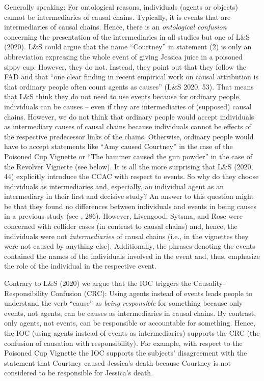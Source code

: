 \documentclass[egregdoesnotlikesansseriftitles,12pt]{scrartcl}
\begin{document}
Generally speaking: For ontological reasons, individuals (agents or objects) cannot be intermediaries of causal chains. Typically, it is events that are intermediaries of causal chains. Hence, there is an \textit{ontological confusion} concerning the presentation of the intermediaries in all studies but one of L\&S (2020). L\&S could argue that the name ``Courtney'' in statement (2) is only an abbreviation expressing the whole event of giving Jessica juice in a poisoned sippy cup. However, they do not. Instead, they point out that they follow the FAD and that ``one clear finding in recent empirical work on causal attribution is that ordinary people often count agents as causes'' (L\&S 2020, 53). That means that L\&S think they do not need to use events because for ordinary people, individuals can be causes -- even if they are intermediaries of (supposed) causal chains. However, we do not think that ordinary people would accept individuals as intermediary causes of causal chains because individuals cannot be effects of the respective predecessor links of the chains. Otherwise, ordinary people would have to accept statements like ``Amy caused Courtney'' in the case of the Poisoned Cup Vignette or ``The hammer caused the gun powder'' in the case of the Revolver Vignette (see below). It is all the more surprising that L\&S (2020, 44) explicitly introduce the CCAC with respect to events. So why do they choose individuals as intermediaries and, especially, an individual agent as an intermediary in their first and decisive study? An answer to this question might be that they found no differences between individuals and events in being causes in a previous study (see \cite{livengood_following_2017}, 286). However, Livengood, Sytsma, and Rose were concerned with collider cases (in contrast to causal chains) and, hence, the individuals were not \textit{intermediaries} of causal chains (i.e., in the vignettes they were not caused by anything else). Additionally, the phrases denoting the events contained the names of the individuals involved in the event and, thus, emphasize the role of the individual in the respective event.

Contrary to L\&S (2020) we argue that the IOC triggers the Causality-Responsibility Confusion (CRC): Using agents instead of events leads people to understand the verb ``cause'' as \textit{being responsible} for something because only events, not agents, can be causes as intermediaries in causal chains. By contrast, only agents, not events, can be responsible or accountable for something. Hence, the IOC (using agents instead of events as intermediaries) supports the CRC (the confusion of causation with responsibility). For example, with respect to the Poisoned Cup Vignette the IOC supports the subjects' disagreement with the statement that Courtney caused Jessica's death because Courtney is not considered to be responsible for Jessica's death.
\end{document}
